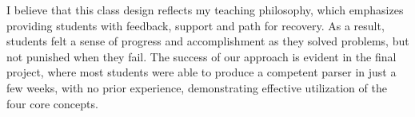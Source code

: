 \documentclass[11pt,a4paper,sans]{moderncv} %
\begin{document}
I believe that this class design reflects my teaching philosophy, which emphasizes providing students with feedback, support and path for recovery. 
As a result, students felt a sense of progress and accomplishment as they solved problems, but not punished when they fail. 
The success of our approach is evident in the final project, where most students were able to produce a competent parser in just a few weeks, with no prior experience, demonstrating effective utilization of the four core concepts.

\newpage
\printbibliography %
\end{document}
